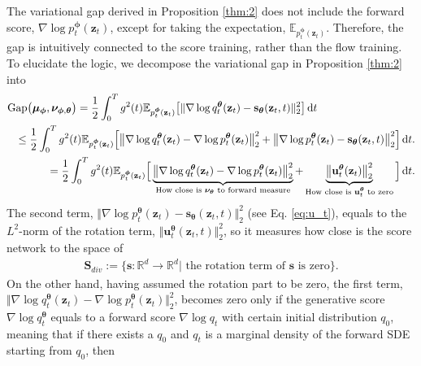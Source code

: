 \documentclass{article}
\theoremstyle{definition}
\theoremstyle{remark}
\newcommand*\diff{\mathop{}\!\mathrm{d}}
\begin{document}
	The variational gap derived in Proposition \ref{thm:2} does not include the forward score, $\nabla\log{p_{t}^{\bm{\phi}}(\mathbf{z}_{t})}$, except for taking the expectation, $\mathbb{E}_{p_{t}^{\bm{\phi}}(\mathbf{z}_{t})}$. Therefore, the gap is intuitively connected to the score training, rather than the flow training. To elucidate the logic, we decompose the variational gap in Proposition \ref{thm:2} into
	\begin{eqnarray}
	\lefteqn{\textup{Gap}\big(\bm{\mu}_{\bm{\phi}},\bm{\nu}_{\bm{\phi},\bm{\theta}}\big)=\frac{1}{2}\int_{0}^{T}g^{2}(t)\mathbb{E}_{p_{t}^{\bm{\phi}}(\mathbf{z}_{t})}\big[\Vert\nabla\log{q_{t}^{\bm{\theta}}(\mathbf{z}_{t})}-\mathbf{s}_{\bm{\theta}}(\mathbf{z}_{t},t)\Vert_{2}^{2}\big]\diff t}&\label{eq:gap_decomposition}\\
	&&\le\frac{1}{2}\int_{0}^{T}g^{2}(t)\mathbb{E}_{p_{t}^{\bm{\phi}}(\mathbf{z}_{t})}\Big[\big\Vert\nabla\log{q_{t}^{\bm{\theta}}(\mathbf{z}_{t})}-\nabla\log{p_{t}^{\bm{\theta}}(\mathbf{z}_{t})}\big\Vert_{2}^{2}+\big\Vert\nabla\log{p_{t}^{\bm{\theta}}(\mathbf{z}_{t})}-\mathbf{s}_{\bm{\theta}}(\mathbf{z}_{t},t)\big\Vert_{2}^{2}\Big]\diff t.\notag\\
	&&=\frac{1}{2}\int_{0}^{T}g^{2}(t)\mathbb{E}_{p_{t}^{\bm{\phi}}(\mathbf{z}_{t})}\Big[\underbrace{\big\Vert\nabla\log{q_{t}^{\bm{\theta}}(\mathbf{z}_{t})}-\nabla\log{p_{t}^{\bm{\theta}}(\mathbf{z}_{t})}\big\Vert_{2}^{2}}_{\text{How close is $\bm{\nu}_{\bm{\theta}}$ to forward measure}}+\underbrace{\big\Vert\mathbf{u}_{t}^{\bm{\theta}}(\mathbf{z}_{t})\big\Vert_{2}^{2}}_{\text{How close is $\mathbf{u}_{t}^{\bm{\theta}}$ to zero}}\Big]\diff t.\notag
	\end{eqnarray}
	The second term, $\Vert\nabla\log{p_{t}^{\bm{\theta}}(\mathbf{z}_{t})}-\mathbf{s}_{\bm{\theta}}(\mathbf{z}_{t},t)\Vert_{2}^{2}$ (see Eq. \eqref{eq:u_t}), equals to the $L^{2}$-norm of the rotation term, $\Vert\mathbf{u}_{t}^{\bm{\theta}}(\mathbf{z}_{t},t)\Vert_{2}^{2}$, so it measures how close is the score network to the space of 
	\begin{align*}
	\mathbf{S}_{div}:=\{\mathbf{s}:\mathbb{R}^{d}\rightarrow\mathbb{R}^{d}\vert\text{ the rotation term of $\mathbf{s}$ is zero}\}.
	\end{align*}
	On the other hand, having assumed the rotation part to be zero, the first term, $\Vert\nabla\log{q_{t}^{\bm{\theta}}(\mathbf{z}_{t})}-\nabla\log{p_{t}^{\bm{\theta}}(\mathbf{z}_{t})}\Vert_{2}^{2}$, becomes zero only if the generative score $\nabla\log{q_{t}^{\bm{\theta}}}$ equals to a forward score $\nabla\log{q_{t}}$ with certain initial distribution $q_{0}$, meaning that if there exists a $q_{0}$ and $q_{t}$ is a marginal density of the forward SDE starting from $q_{0}$, then 
\end{document}
